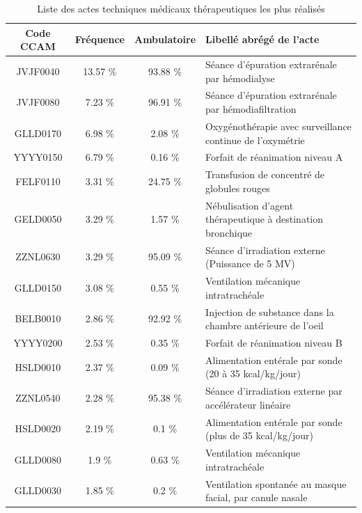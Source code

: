 \begin{table}[!ht]
\centering
\caption{Liste des actes techniques médicaux thérapeutiques les plus réalisés}
\label{liste1}
\begin{tabular}{c|ccl}
  \hline
Code CCAM & Fréquence & Ambulatoire & Libellé abrégé de l'acte \\ 
  \hline
JVJF0040 & 13.57 \% & 93.88 \% & Séance d'épuration extrarénale par hémodialyse\\ 
  JVJF0080 & 7.23 \% & 96.91 \% & Séance d'épuration extrarénale par hémodiafiltration \\ 
  GLLD0170 & 6.98 \% & 2.08 \% & Oxygénothérapie avec surveillance continue de l'oxymétrie \\ 
  YYYY0150 & 6.79 \% & 0.16 \% & Forfait de réanimation niveau A \\ 
  FELF0110 & 3.31 \% & 24.75 \% & Transfusion de concentré de globules rouges \\ 
  GELD0050 & 3.29 \% & 1.57 \% & Nébulisation d'agent thérapeutique à destination bronchique \\ 
  ZZNL0630 & 3.29 \% & 95.09 \% & Séance d'irradiation externe (Puissance de 5 MV) \\ 
  GLLD0150 & 3.08 \% & 0.55 \% & Ventilation mécanique intratrachéale \\ 
  BELB0010 & 2.86 \% & 92.92 \% & Injection de substance dans la chambre antérieure de l'oeil \\ 
  YYYY0200 & 2.53 \% & 0.35 \% & Forfait de réanimation niveau B \\ 
  HSLD0010 & 2.37 \% & 0.09 \% & Alimentation entérale par sonde (20 à 35 kcal/kg/jour) \\ 
  ZZNL0540 & 2.28 \% & 95.38 \% & Séance d'irradiation externe par accélérateur linéaire \\ 
  HSLD0020 & 2.19 \% & 0.1 \% & Alimentation entérale par sonde (plus de 35 kcal/kg/jour) \\ 
  GLLD0080 & 1.9 \% & 0.63 \% & Ventilation mécanique intratrachéale \\ 
  GLLD0030 & 1.85 \% & 0.2 \% & Ventilation spontanée au masque facial, par canule nasale \\ 
   \hline
\end{tabular} 
\end{table}



